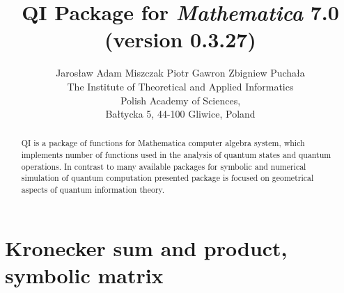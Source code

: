 \documentclass[a4paper,10pt]{scrartcl}
\begin{document}
\title{QI Package for \emph{Mathematica} 7.0 \\(version 0.3.27)}\author{Jaros{\l}aw Adam Miszczak \quad Piotr Gawron \quad Zbigniew Pucha{\l}a\\
{The Institute of Theoretical and Applied Informatics}\\
{Polish Academy of Sciences},\\
{Ba{\l}tycka 5, 44-100 Gliwice, Poland}}
\maketitle
\begin{abstract}QI is a package of functions for Mathematica computer algebra system, which implements 
number of functions used in the analysis of quantum states and quantum operations. In contrast to 
many available packages for symbolic and numerical simulation of quantum computation presented 
package is focused on geometrical aspects of quantum information theory.\end{abstract}
\section{Kronecker sum and product, symbolic matrix}
\end{document}
